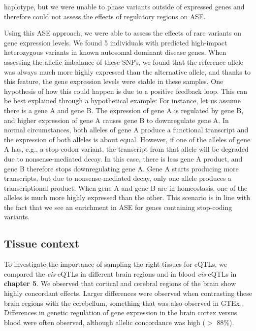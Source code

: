 haplotype, but we were unable to phase variants outside of expressed genes and therefore could not assess the effects of regulatory regions on ASE.


Using this ASE approach, we were able to assess the effects of rare variants on gene expression levels. We found 5 individuals with predicted high-impact heterozygous variants in known autosomal dominant disease genes. When assessing the allelic imbalance of these SNPs, we found that the reference allele was always much more highly expressed than the alternative allele, and thanks to this feature, the gene expression levels were stable in these samples. One hypothesis of how this could happen is due to a positive feedback loop. This can be best explained through a hypothetical example: For instance, let us assume there is a gene A and gene B. The expression of gene A is regulated by gene B, and higher expression of gene A causes gene B to downregulate gene A. In normal circumstances, both alleles of gene A produce a functional transcript and the expression of both alleles is about equal. However, if one of the alleles of gene A has, e.g., a stop-codon variant, the transcript from that allele will be degraded due to nonsense-mediated decay. In this case, there is less gene A product, and gene B therefore stops downregulating gene A. Gene A starts producing more transcripts, but due to nonsense-mediated decay, only one allele produces a transcriptional product. When gene A and gene B are in homeostasis, one of the alleles is much more highly expressed than the other. This scenario is in line with the fact that we see an enrichment in ASE for genes containing stop-coding variants.


\subsection{Tissue context}
To investigate the importance of sampling the right tissues for eQTLs, we compared the \textit{cis}-eQTLs in different brain regions and in blood \textit{cis}-eQTLs in \textbf{chapter 5}. We observed that cortical and cerebral regions of the brain show highly concordant effects. Larger differences were observed when contrasting these brain regions with the cerebellum, something that was also observed in GTEx \cite{thegtexconsortiumGTExConsortiumAtlas2020}. Differences in genetic regulation of gene expression in the brain cortex versus blood were often observed, although allelic concordance was high ($>$ 88\%). 

